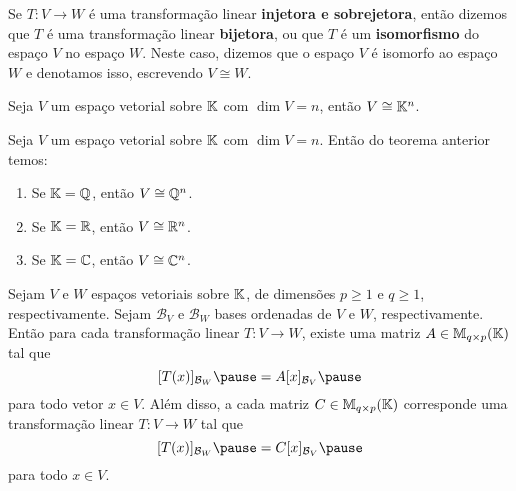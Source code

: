 \documentclass{beamer}
\begin{document}
    \begin{frame}
        \begin{definicao}
            Se $T \colon V \to W$ é uma transformação linear \pause \textbf{injetora e sobrejetora}, \pause então dizemos que $T$ é uma
            transformação linear \textbf{bijetora}, \pause ou que $T$ é um \textbf{isomorfismo} \pause do espaço $V$ no espaço $W$.
            \pause Neste caso, dizemos que o espaço $V$ é isomorfo ao espaço $W$ \pause e denotamos isso, escrevendo $V \cong W$.\pause
        \end{definicao}

        \begin{teorema}
            Seja $V$ um espaço vetorial sobre $\mathbb{K}$ \pause com $\dim V = n$, \pause então $V \cong \mathbb{K}^n$.
        \end{teorema}
    \end{frame}

    \begin{frame}
        \begin{observacoes}
            Seja $V$ um espaço vetorial sobre $\mathbb{K}$ \pause com $\dim V = n$. \pause Então do teorema anterior temos:\pause
            \begin{enumerate}[label={\roman*})]
                \vspace*{.25cm}
                \item Se $\mathbb{K} = \mathbb{Q}$, \pause então $V \cong \mathbb{Q}^n$.\pause

                \vspace{.75cm}

                \item Se $\mathbb{K} = \mathbb{R}$, \pause então $V \cong \mathbb{R}^n$.\pause

                \vspace{.75cm}

                \item Se $\mathbb{K} = \mathbb{C}$, \pause então $V \cong \mathbb{C}^n$.
            \end{enumerate}
        \end{observacoes}
    \end{frame}


    \begin{frame}
        \begin{teorema}
            Sejam $V$ e $W$ espaços vetoriais sobre $\mathbb{K}$, \pause de dimensões $p \ge 1$ e $q \ge 1$, respectivamente. \pause Sejam
            $\mathcal{B}_V$ e $\mathcal{B}_W$ bases ordenadas de $V$ e $W$, respectivamente. \pause Então para cada transformação linear
            $T \colon V \to W$, \pause existe uma matriz $A \in \mathbb{M}_{q\times p}(\mathbb{K})$ tal que\pause
            \[
                [T(x)]_{\mathcal{B}_W} \pause = A[x]_{\mathcal{B}_V}\pause
            \]
            para todo vetor $x \in V$. \pause Além disso, \pause a cada matriz $C \in \mathbb{M}_{q\times p}(\mathbb{K})$ \pause corresponde uma
            transformação linear $T \colon V \to W$ tal que\pause
            \[
                [T(x)]_{\mathcal{B}_W} \pause = C[x]_{\mathcal{B}_V}\pause
            \]
            para todo $x \in V$.
        \end{teorema}
    \end{frame}
\end{document}
